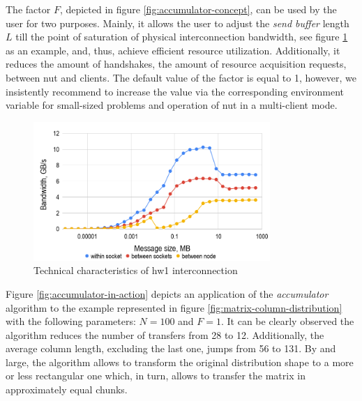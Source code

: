 The factor $F$, depicted in figure \ref{fig:accumulator-concept}, can be used by the user for two purposes. Mainly, it allows the user to adjust the \textit{send buffer} length $L$ till the point of saturation of physical interconnection bandwidth, see figure \ref{fig:hw1-bandwidth} as an example, and, thus, achieve efficient resource utilization. Additionally, it reduces the amount of handshakes, the amount of resource acquisition requests, between \gls{nut} and clients. The default value of the factor is equal to 1, however, we insistently recommend to increase the value via the corresponding environment variable for small-sized problems and operation of \gls{nut} in a multi-client mode.\\


\begin{figure}[htpb]
  \centering
  \includegraphics[width=0.8\textwidth]{figures/chapter-3/hw1-bandwidth.png}
  \caption{Technical characteristics of \gls{hw1} interconnection} \label{fig:hw1-bandwidth}
\end{figure}



Figure \ref{fig:accumulator-in-action} depicts an application of the \textit{accumulator} algorithm to the example represented in figure \ref{fig:matrix-column-distribution} with the following parameters: $N = 100$ and $F = 1$. It can be clearly observed the algorithm reduces the number of transfers from 28 to 12. Additionally, the average column length, excluding the last one, jumps from 56 to 131. By and large, the algorithm allows to transform the original distribution shape to a more or less rectangular one which, in turn, allows to transfer the matrix in approximately equal chunks.\\



